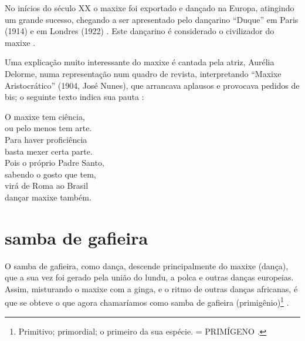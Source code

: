 No inícios do século XX o maxixe foi exportado e dançado na Europa, atingindo um grande sucesso, 
chegando a ser apresentado pelo dançarino ``Duque'' em Paris (1914) e em Londres (1922) \cite[pp. 465]{marcondes1977enciclopedia}.
Este dançarino é considerado o civilizador do maxixe \cite[pp. 129]{efege1974maxixe}.

Uma explicação muito interessante do maxixe é cantada pela atriz, Aurélia Delorme,
numa representação num quadro de revista, interpretando  ``Maxixe Aristocrático'' (1904, José Nunes), 
que arrancava aplausos e provocava pedidos de bis;
o seguinte texto indica sua pauta \cite[pp. 80-81]{efege1974maxixe} \cite{REIS2003}: 
\begin{citando}
O maxixe tem ciência,\\
ou pelo menos tem arte.\\
Para haver proficiência\\
basta mexer certa parte.\\
Pois o próprio Padre Santo,\\
sabendo o gosto que tem,\\
virá de Roma ao Brasil\\
dançar maxixe também.\\ 
\end{citando}



\section{samba de gafieira}
O samba de gafieira, como dança, descende principalmente do maxixe (dança),
que a sua vez foi gerado  pela união do  lundu, 
a polca e outras danças europeias.
Assim, misturando o maxixe com a ginga, e o ritmo de outras danças africanas, 
é que se obteve o que agora chamaríamos como samba de gafieira (primigênio)\footnote{
Primitivo; primordial; o primeiro da sua espécie. = PRIMÍGENO \cite{priberamprimigenio}.
} \cite[pp. 139]{perna2002samba}.




